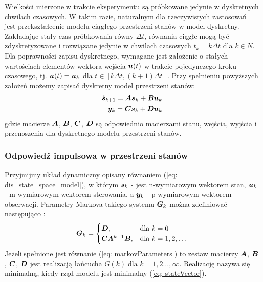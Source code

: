 Wielkości mierzone w trakcie eksperymentu są próbkowane jedynie w dyskretnych chwilach czasowych. W takim razie, naturalnym dla rzeczywistych zastosowań jest przekształcenie modelu ciągłego przestrzeni stanów w model dyskretny. Zakładając stały czas próbkowania równy $\Delta t$, równania ciągłe mogą być zdyskretyzowane i rozwiązane jedynie w chwilach czasowych $t_k=k\Delta t$ dla $k\in N$. Dla poprawności zapisu dyskretnego, wymagane jest założenie o stałych wartościach elementów wektora wejścia $\bm{u}(t)$ w trakcie pojedynczego kroku czasowego, tj. $\bm{u}(t)=\bm{u}_k$ dla $t \in [k\Delta t, (k+1)\Delta t]$. Przy spełnieniu powyższych założeń możemy zapisać dyskretny model przestrzeni stanów:
\begin{equation} \label{eq: dis_state_space_model}
	\begin{aligned}
		\bm{\dot{s}}_{k+1}= \bm{A}\bm{s}_k+\bm{B}\bm{u}_k \\
		\bm{y}_k = \bm{C}\bm{s}_k+\bm{D}\bm{u}_k
	\end{aligned}
\end{equation}
gdzie macierze $\bm{A}$, $\bm{B}$, $\bm{C}$, $\bm{D}$ są odpowiednio macierzami stanu, wejścia, wyjścia i przenoszenia dla dyskretnego modelu przestrzeni stanów.

\subsubsection{Odpowiedź impulsowa w przestrzeni stanów}
Przyjmijmy układ dynamiczny opisany równaniem (\ref{eq: dis_state_space_model}), w którym $\bm{s}_k$ - jest n-wymiarowym wektorem stan, $\bm{u}_k$ - m-wymiarowym wektorem sterowania, a $\bm{y}_k$ - p-wymiarowym wektorem obserwacji. Parametry Markova takiego systemu $\bm{G}_k$ można zdefiniować następująco \parencite{Schutter2000}:
\begin{equation} \label{eq: markovParameters}
		\bm{G}_k= \begin{cases}
\bm{D}, & \text{dla }k=0 \\
\bm{C}\bm{A}^{k-1}\bm{B}, & \text{dla }k=1,2, \dots
\end{cases}
\end{equation}
Jeżeli spełnione jest równanie (\ref{eq: markovParameters}) to zestaw macierzy $\bm{A}$, $\bm{B}$, $\bm{C}$, $\bm{D}$ jest realizacją łańcucha $G(k)\; \text{dla } k=1,2\dots,\infty$. Realizację nazywa się minimalną, kiedy rząd modelu jest minimalny (\ref{eq: stateVector}).

